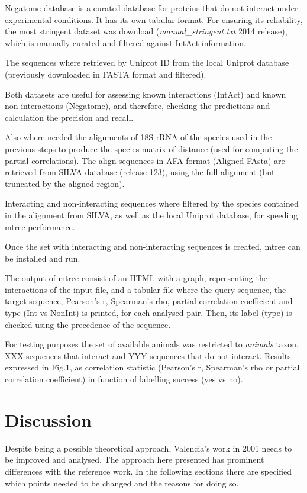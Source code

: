 \documentclass[11pt]{article}
\begin{document}
Negatome database\cite{negatome} is a curated database for proteins that do not interact under experimental conditions. It has its own tabular format. For ensuring its reliability, the most stringent dataset was download (\textit{manual_stringent.txt} 2014 release), which is manually curated and filtered against IntAct information.

The sequences where retrieved by Uniprot ID from the local Uniprot database (previously downloaded in FASTA format and filtered). 

Both datasets are useful for assessing known interactions (IntAct) and known non-interactions (Negatome), and therefore, checking the predictions and calculation the precision and recall.

Also where needed the alignments of 18S rRNA of the species used in the previous steps to produce the species matrix of distance (used for computing the partial correlations). The align sequences in AFA format (Aligned FAsta) are retrieved from SILVA database\cite{SILVA} (release 123), using the full alignment (but truncated by the aligned region).

Interacting and non-interacting sequences where filtered by the species contained in the alignment from SILVA, as well as the local Uniprot database, for speeding mtree performance.

Once the set with interacting and non-interacting sequences is created, mtree can be installed and run.

The output of mtree consist of an HTML with a graph, representing the interactions of the input file, and a tabular file where the query sequence, the target sequence, Pearson's r, Spearman's rho, partial correlation coefficient and type (Int vs NonInt) is printed, for each analysed pair. Then, its label (type) is checked using the precedence of the sequence.

For testing purposes the set of available animals was restricted to \textit{animals} taxon, XXX sequences that interact and YYY sequences that do not interact. Results expressed in Fig.1, as correlation statistic (Pearson's r, Spearman's rho or partial correlation coefficient) in function of labelling success (yes vs no).

\section{Discussion}
Despite being a possible theoretical approach, Valencia's work in 2001\cite{Pazos2001} needs to be improved and analysed. The approach here presented has prominent differences with the reference work. In the following sections there are specified which points needed to be changed and the reasons for doing so.
\end{document}
